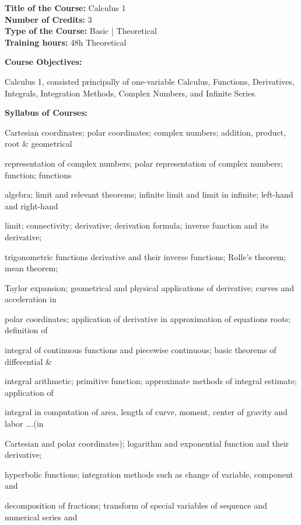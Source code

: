 \documentclass[12pt,a4paper]{article}
\begin{document}
\newpage
\textbf{Title of the Course:} Calculus 1\\
\textbf{Number of Credits:} 3\\
\textbf{Type of the Course:} Basic | Theoretical\\
\textbf{Training hours:} 48h Theoretical\par\vspace{4pt}
\textbf{Course Objectives:}\par\vspace{2pt}
Calculus 1, consisted principally of one-variable Calculus, Functions, Derivatives, Integrals,
Integration Methods, Complex Numbers, and Infinite Series.\par\vspace{4pt}
\textbf{Syllabus of Courses:}\par\vspace{2pt}
Cartesian coordinates; polar coordinates; complex numbers; addition, product, root \& geometrical\par
representation of complex numbers; polar representation of complex numbers; function; functions\par
algebra; limit and relevant theorems; infinite limit and limit in infinite; left-hand and right-hand\par
limit; connectivity; derivative; derivation formula; inverse function and its derivative;\par
trigonometric functions derivative and their inverse functions; Rolle’s theorem; mean theorem;\par
Taylor expansion; geometrical and physical applications of derivative; curves and acceleration in\par
polar coordinates; application of derivative in approximation of equations roots; definition of\par
integral of continuous functions and piecewise continuous; basic theorems of differential \&\par
integral arithmetic; primitive function; approximate methods of integral estimate; application of\par
integral in computation of area, length of curve, moment, center of gravity and labor ….(in\par
Cartesian and polar coordinates); logarithm and exponential function and their derivative;\par
hyperbolic functions; integration methods such as change of variable, component and\par
decomposition of fractions; transform of special variables of sequence and numerical series and\par
\end{document}
